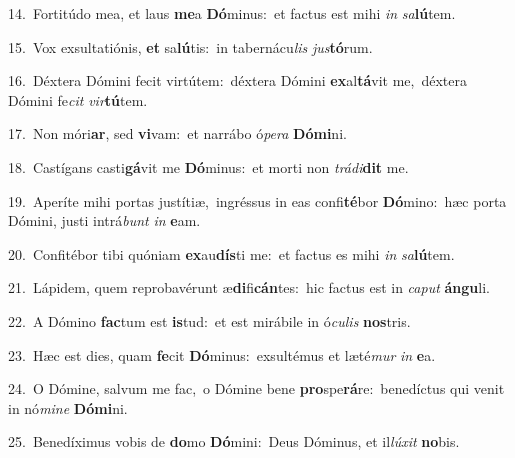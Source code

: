 {\numbfont\textcolor{\numbcolor}{14.}}~Fortitúdo mea, et laus \textbf{me}\-a \textbf{Dó}\-minus:~\star et factus est mihi \textit{in} \textit{sa}\-\textbf{lú}tem.\par
{\numbfont\textcolor{\numbcolor}{15.}}~Vox exsultatiónis, \textbf{et} sa\-\textbf{lú}\-tis:~\star in tabernácu\textit{lis} \textit{jus}\-\textbf{tó}rum.\par
{\numbfont\textcolor{\numbcolor}{16.}}~Déxtera Dómini fecit virtútem:~\dagger déxtera Dómini \textbf{ex}\-al\-\textbf{tá}\-vit me,~\star déxtera Dómini fe\textit{cit} \textit{vir}\-\textbf{tú}tem.\par
{\numbfont\textcolor{\numbcolor}{17.}}~Non móri\-\textbf{ar}\-, sed \textbf{vi}\-vam:~\star et narrábo ó\-\textit{pe}\-\textit{ra} \textbf{Dó}\-\textbf{mi}ni.\par
{\numbfont\textcolor{\numbcolor}{18.}}~Castígans casti\-\textbf{gá}\-vit me \textbf{Dó}\-minus:~\star et morti non \textit{trá}\-\textit{di}\textbf{dit} me.\par
{\numbfont\textcolor{\numbcolor}{19.}}~Aperíte mihi portas justítiæ,~\dagger ingréssus in eas confi\-\textbf{té}\-bor \textbf{Dó}\-mino:~\star hæc porta Dómini, justi intrá\textit{bunt} \textit{in} \textbf{e}\-am.\par
{\numbfont\textcolor{\numbcolor}{20.}}~Confitébor tibi quóniam \textbf{ex}\-au\-\textbf{dís}\-ti me:~\star et factus es mihi \textit{in} \textit{sa}\-\textbf{lú}tem.\par
{\numbfont\textcolor{\numbcolor}{21.}}~Lápidem, quem reprobavérunt æ\-\textbf{di}\-fi\-\textbf{cán}\-tes:~\star hic factus est in \textit{ca}\-\textit{put} \textbf{án}\-\textbf{gu}li.\par
{\numbfont\textcolor{\numbcolor}{22.}}~A Dómino \textbf{fac}\-tum est \textbf{is}\-tud:~\star et est mirábile in ó\-\textit{cu}\-\textit{lis} \textbf{nos}\-tris.\par
{\numbfont\textcolor{\numbcolor}{23.}}~Hæc est dies, quam \textbf{fe}\-cit \textbf{Dó}\-minus:~\star exsultémus et læté\textit{mur} \textit{in} \textbf{e}\-a.\par
{\numbfont\textcolor{\numbcolor}{24.}}~O Dómine, salvum me fac,~\dagger o Dómine bene \textbf{pro}\-spe\-\textbf{rá}\-re:~\star benedíctus qui venit in nó\-\textit{mi}\-\textit{ne} \textbf{Dó}\-\textbf{mi}ni.\par
{\numbfont\textcolor{\numbcolor}{25.}}~Benedíximus vobis de \textbf{do}\-mo \textbf{Dó}\-mini:~\star Deus Dóminus, et il\-\textit{lú}\-\textit{xit} \textbf{no}\-bis.\par

